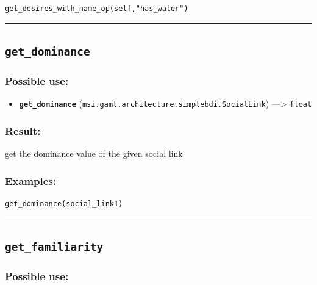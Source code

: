 \documentclass[]{book}
\providecommand{\tightlist}{%
  \setlength{\itemsep}{0pt}\setlength{\parskip}{0pt}}
\theoremstyle{definition}
\theoremstyle{definition}
\theoremstyle{definition}
\theoremstyle{remark}
\begin{document}
\begin{verbatim}
get_desires_with_name_op(self,"has_water") 
\end{verbatim}

\begin{center}\rule{0.5\linewidth}{\linethickness}\end{center}

\subsection{\texorpdfstring{\texttt{get\_dominance}}{get\_dominance}}\label{get_dominance}

\subsubsection{Possible use:}\label{possible-use-207}

\begin{itemize}
\tightlist
\item
  \textbf{\texttt{get\_dominance}}
  (\texttt{msi.gaml.architecture.simplebdi.SocialLink})
  ---\textgreater{} \texttt{float}
\end{itemize}

\subsubsection{Result:}\label{result-201}

get the dominance value of the given social link

\subsubsection{Examples:}\label{examples-154}

\begin{verbatim}
get_dominance(social_link1) 
\end{verbatim}

\begin{center}\rule{0.5\linewidth}{\linethickness}\end{center}

\subsection{\texorpdfstring{\texttt{get\_familiarity}}{get\_familiarity}}\label{get_familiarity}

\subsubsection{Possible use:}\label{possible-use-208}
\end{document}
